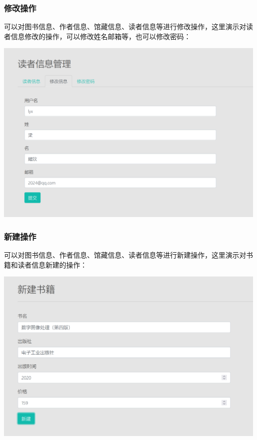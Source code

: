 \documentclass[a4paper,14pt]{article}
\begin{document}
\subsubsection{修改操作}
可以对图书信息、作者信息、馆藏信息、读者信息等进行修改操作，这里演示对读者信息修改的操作，可以修改姓名邮箱等，也可以修改密码：

\vspace{10pt}
\begin{center}
    \includegraphics[width=0.7\linewidth]{images/xiugai1.png}\end{center}
\vspace{5pt}





\subsubsection{新建操作}
可以对图书信息、作者信息、馆藏信息、读者信息等进行新建操作，这里演示对书籍和读者信息新建的操作：

\vspace{10pt}
\begin{center}
    \includegraphics[width=0.7\linewidth]{images/xinjian1.png}\end{center}
\vspace{5pt}
\end{document}
